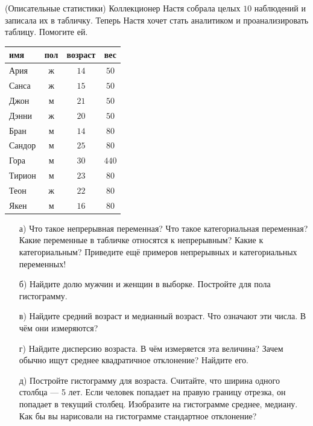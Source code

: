 \documentclass[12pt, a4paper, oneside]{article}
\begin{document}
\begin{problem}{(Описательные статистики)}
Коллекционер Настя собрала целых $10$ наблюдений и записала их в табличку. Теперь Настя хочет стать аналитиком и проанализировать таблицу. Помогите ей. 

\begin{center}
	\begin{tabular}{lccc}
		\toprule
		имя & пол  & возраст  & вес  \\ \midrule
		Ария & ж  & $14$ &   $50$  \\
		Санса & ж & $15$ &  $50$  \\
		Джон & м & $21$ &  $50$   \\
		Дэнни & ж & $20$ &   $50$ \\
		Бран & м & $14$ &   $80$ \\
		Сандор & м & $25$ &   $80$\\
		Гора & м & $30$ &   $440$\\
		Тирион & м & $23$ &    $80$\\
		Теон & ж & $22$ &    $80$\\
		Якен & м & $16$  &    $80$\\ \bottomrule
	\end{tabular}	
\end{center}

\begin{enumerate}
	\item[а)] Что такое непрерывная переменная? Что такое категориальная переменная? Какие переменные в табличке относятся к непрерывным? Какие к категориальным?  Приведите ещё примеров непрерывных и категориальных переменных! 
	
	\item[б)]  Найдите долю мужчин и женщин в выборке. Постройте для пола гистограмму. 
	
	\item[в)] Найдите средний возраст и медианный возраст.  Что означают эти числа. В чём они измеряются? 

	\item[г)] Найдите дисперсию возраста. В чём измеряется эта величина? Зачем обычно ищут среднее квадратичное отклонение? Найдите его. 	
	
	\item[д)]  Постройте гистограмму для возраста. Считайте, что ширина одного столбца --- 5 лет. Если человек попадает на правую границу отрезка, он попадает в текущий столбец.  Изобразите на гистограмме среднее, медиану. Как бы вы нарисовали на гистограмме стандартное отклонение? 
	

\end{enumerate}
\end{problem}
\end{document}
